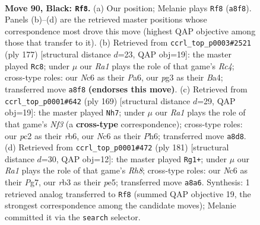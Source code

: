 \documentclass[11pt]{article}
\begin{document}
\clearpage

\begin{figure}[p]\centering
\begin{subfigure}{0.46\textwidth}\centering
\resizebox{\linewidth}{!}{%
\newchessgame
\chessboard[
  setfen={r7/3k4/P1n5/8/8/1R4PP/2P1B3/3K4 b - - 14 90},
  showmover=false,
  pgfstyle=straightmove, color=movearrow, markmove={a8-f8}
]}
\caption{}
\end{subfigure}\hfill
\begin{subfigure}{0.46\textwidth}\centering
\resizebox{\linewidth}{!}{%
\newchessgame
\chessboard[
  setfen={8/5k2/p7/P1r5/b3KP2/8/3BR3/8 b - - 0 89},
  showmover=false,
  pgfstyle=straightmove, color=movearrow, markmove={c5-c8}
]}
\caption{}
\end{subfigure}
\\[4pt]
\begin{subfigure}{0.46\textwidth}\centering
\resizebox{\linewidth}{!}{%
\newchessgame
\chessboard[
  setfen={8/r5k1/1R2Bn1p/8/6P1/5PK1/8/8 b - - 28 85},
  showmover=false,
  pgfstyle=straightmove, color=movearrow, markmove={f6-h7}
]}
\caption{}
\end{subfigure}\hfill
\begin{subfigure}{0.46\textwidth}\centering
\resizebox{\linewidth}{!}{%
\newchessgame
\chessboard[
  setfen={5k2/6p1/6B1/4P2P/5PK1/8/8/7r b - - 6 91},
  showmover=false,
  pgfstyle=straightmove, color=movearrow, markmove={h1-g1}
]}
\caption{}
\end{subfigure}
\caption{\textbf{Move 90, Black: \texttt{Rf8}.} (a) Our position; Melanie plays \texttt{Rf8} (\texttt{a8f8}). Panels (b)--(d) are the retrieved master positions whose correspondence most drove this move (highest QAP objective among those that transfer to it). (b) Retrieved from \texttt{ccrl\_top\_p0003\#2521} (ply 177) [structural distance $d$=23, QAP obj=19]: the master played \texttt{Rc8}; under $\mu$ our \emph{Ra1} plays the role of that game's \emph{Rc4}; cross-type roles: our \emph{N}c6 as their \emph{P}a6, our \emph{p}g3 as their \emph{B}a4; transferred move \texttt{a8f8} \textbf{(endorses this move)}. (c) Retrieved from \texttt{ccrl\_top\_p0001\#642} (ply 169) [structural distance $d$=29, QAP obj=19]: the master played \texttt{Nh7}; under $\mu$ our \emph{Ra1} plays the role of that game's \emph{Nf3} (a \textbf{cross-type} correspondence); cross-type roles: our \emph{p}c2 as their \emph{r}b6, our \emph{N}c6 as their \emph{P}h6; transferred move \texttt{a8d8}. (d) Retrieved from \texttt{ccrl\_top\_p0001\#472} (ply 181) [structural distance $d$=30, QAP obj=12]: the master played \texttt{Rg1+}; under $\mu$ our \emph{Ra1} plays the role of that game's \emph{Rh8}; cross-type roles: our \emph{N}c6 as their \emph{P}g7, our \emph{r}b3 as their \emph{p}e5; transferred move \texttt{a8a6}. Synthesis: 1 retrieved analog transferred to \texttt{Rf8} (summed QAP objective 19, the strongest correspondence among the candidate moves); Melanie committed it via the \texttt{search} selector.}
\label{fig:thought-m179}
\end{figure}
\end{document}
